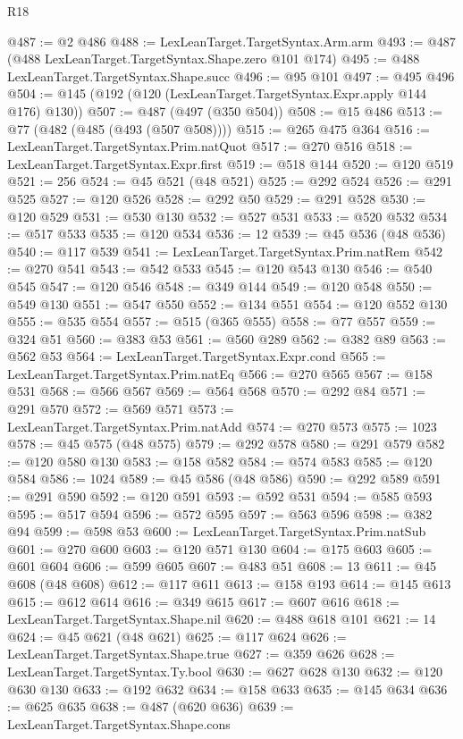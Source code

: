 \begin{lexlean}{R18}
\begin{coremodule}
@487 := @2 @486
@488 := LexLeanTarget.TargetSyntax.Arm.arm
@493 := @487 (@488 LexLeanTarget.TargetSyntax.Shape.zero @101 @174)
@495 := @488 LexLeanTarget.TargetSyntax.Shape.succ
@496 := @95 @101
@497 := @495 @496
@504 := @145 (@192 (@120 (LexLeanTarget.TargetSyntax.Expr.apply @144 @176) @130))
@507 := @487 (@497 (@350 @504))
@508 := @15 @486
@513 := @77 (@482 (@485 (@493 (@507 @508))))
@515 := @265 @475 @364
@516 := LexLeanTarget.TargetSyntax.Prim.natQuot
@517 := @270 @516
@518 := LexLeanTarget.TargetSyntax.Expr.first
@519 := @518 @144
@520 := @120 @519
@521 := 256
@524 := @45 @521 (@48 @521)
@525 := @292 @524
@526 := @291 @525
@527 := @120 @526
@528 := @292 @50
@529 := @291 @528
@530 := @120 @529
@531 := @530 @130
@532 := @527 @531
@533 := @520 @532
@534 := @517 @533
@535 := @120 @534
@536 := 12
@539 := @45 @536 (@48 @536)
@540 := @117 @539
@541 := LexLeanTarget.TargetSyntax.Prim.natRem
@542 := @270 @541
@543 := @542 @533
@545 := @120 @543 @130
@546 := @540 @545
@547 := @120 @546
@548 := @349 @144
@549 := @120 @548
@550 := @549 @130
@551 := @547 @550
@552 := @134 @551
@554 := @120 @552 @130
@555 := @535 @554
@557 := @515 (@365 @555)
@558 := @77 @557
@559 := @324 @51
@560 := @383 @53
@561 := @560 @289
@562 := @382 @89
@563 := @562 @53
@564 := LexLeanTarget.TargetSyntax.Expr.cond
@565 := LexLeanTarget.TargetSyntax.Prim.natEq
@566 := @270 @565
@567 := @158 @531
@568 := @566 @567
@569 := @564 @568
@570 := @292 @84
@571 := @291 @570
@572 := @569 @571
@573 := LexLeanTarget.TargetSyntax.Prim.natAdd
@574 := @270 @573
@575 := 1023
@578 := @45 @575 (@48 @575)
@579 := @292 @578
@580 := @291 @579
@582 := @120 @580 @130
@583 := @158 @582
@584 := @574 @583
@585 := @120 @584
@586 := 1024
@589 := @45 @586 (@48 @586)
@590 := @292 @589
@591 := @291 @590
@592 := @120 @591
@593 := @592 @531
@594 := @585 @593
@595 := @517 @594
@596 := @572 @595
@597 := @563 @596
@598 := @382 @94
@599 := @598 @53
@600 := LexLeanTarget.TargetSyntax.Prim.natSub
@601 := @270 @600
@603 := @120 @571 @130
@604 := @175 @603
@605 := @601 @604
@606 := @599 @605
@607 := @483 @51
@608 := 13
@611 := @45 @608 (@48 @608)
@612 := @117 @611
@613 := @158 @193
@614 := @145 @613
@615 := @612 @614
@616 := @349 @615
@617 := @607 @616
@618 := LexLeanTarget.TargetSyntax.Shape.nil
@620 := @488 @618 @101
@621 := 14
@624 := @45 @621 (@48 @621)
@625 := @117 @624
@626 := LexLeanTarget.TargetSyntax.Shape.true
@627 := @359 @626
@628 := LexLeanTarget.TargetSyntax.Ty.bool
@630 := @627 @628 @130
@632 := @120 @630 @130
@633 := @192 @632
@634 := @158 @633
@635 := @145 @634
@636 := @625 @635
@638 := @487 (@620 @636)
@639 := LexLeanTarget.TargetSyntax.Shape.cons

\end{coremodule}
\end{lexlean}
